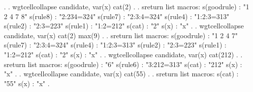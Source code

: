 {\smallskip}
. 
. wgtcellcollapse candidate, var(x) cat(2)
{\smallskip}
. 
. sreturn list
{\smallskip}
macros:
           s(goodrule) : "1 2 4 7 8"
              s(rule8) : "2:234=324"
              s(rule7) : "2:3:4=324"
              s(rule4) : "1:2:3=313"
              s(rule2) : "2:3=223"
              s(rule1) : "1:2=212"
                s(cat) : "2"
                  s(x) : "x"
{\smallskip}
. 
. wgtcellcollapse candidate, var(x) cat(2) max(9)
{\smallskip}
. 
. sreturn list
{\smallskip}
macros:
           s(goodrule) : "1 2 4 7"
              s(rule7) : "2:3:4=324"
              s(rule4) : "1:2:3=313"
              s(rule2) : "2:3=223"
              s(rule1) : "1:2=212"
                s(cat) : "2"
                  s(x) : "x"
{\smallskip}
. 
. wgtcellcollapse candidate, var(x) cat(212)
{\smallskip}
. 
. sreturn list
{\smallskip}
macros:
           s(goodrule) : "6"
              s(rule6) : "3:212=313"
                s(cat) : "212"
                  s(x) : "x"
{\smallskip}
. 
. wgtcellcollapse candidate, var(x) cat(55)
{\smallskip}
. 
. sreturn list
{\smallskip}
macros:
                s(cat) : "55"
                  s(x) : "x"
{\smallskip}
. 
